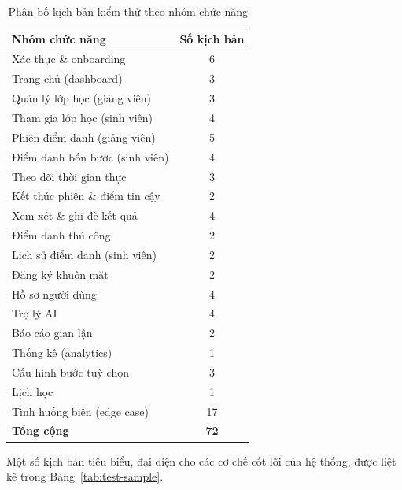 \documentclass[../main.tex]{subfiles}
\begin{document}
\begin{table}[H]
\centering
\small
\caption{Phân bố kịch bản kiểm thử theo nhóm chức năng}
\label{tab:test-coverage}
\begin{tabular}{|p{9cm}|c|}
\hline
\textbf{Nhóm chức năng} & \textbf{Số kịch bản} \\
\hline
Xác thực \& onboarding & 6 \\ \hline
Trang chủ (dashboard) & 3 \\ \hline
Quản lý lớp học (giảng viên) & 3 \\ \hline
Tham gia lớp học (sinh viên) & 4 \\ \hline
Phiên điểm danh (giảng viên) & 5 \\ \hline
Điểm danh bốn bước (sinh viên) & 4 \\ \hline
Theo dõi thời gian thực & 3 \\ \hline
Kết thúc phiên \& điểm tin cậy & 2 \\ \hline
Xem xét \& ghi đè kết quả & 4 \\ \hline
Điểm danh thủ công & 2 \\ \hline
Lịch sử điểm danh (sinh viên) & 2 \\ \hline
Đăng ký khuôn mặt & 2 \\ \hline
Hồ sơ người dùng & 4 \\ \hline
Trợ lý AI & 4 \\ \hline
Báo cáo gian lận & 2 \\ \hline
Thống kê (analytics) & 1 \\ \hline
Cấu hình bước tuỳ chọn & 3 \\ \hline
Lịch học & 1 \\ \hline
Tình huống biên (edge case) & 17 \\ \hline
\textbf{Tổng cộng} & \textbf{72} \\ \hline
\end{tabular}
\end{table}

Một số kịch bản tiêu biểu, đại diện cho các cơ chế cốt lõi của hệ thống, được liệt kê trong
Bảng~\ref{tab:test-sample}.
\end{document}
